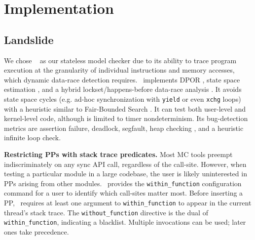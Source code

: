 \section{Implementation}
\label{sec:implementation}

\subsection{Landslide}
\label{sec:landslide}

We chose \landslide~\cite{landslide} as our stateless model checker due to its ability to trace program execution at the granularity of individual instructions and memory accesses, which dynamic data-race detection requires.
\landslide~implements DPOR \cite{dpor},
state space estimation \cite{estimation}, and a hybrid lockset/happens-before data-race analysis \cite{hybriddatarace}.
It avoids state space cycles (e.g. ad-hoc synchronization with {\tt yield} or even {\tt xchg} loops) with a heuristic similar to Fair-Bounded Search \cite{bpor}.
It can test both user-level and kernel-level code, although is limited to timer nondeterminism.
Its bug-detection metrics are assertion failure, deadlock, segfault, heap checking \cite{valgrind}, and a heuristic infinite loop check.

{\bf Restricting PPs with stack trace predicates.}
Most MC tools preempt indiscriminately on any sync API call, regardless of the call-site.
However, when testing a particular module in a large codebase,
the user is likely uninterested in PPs arising from other modules.
\landslide~provides the {\tt within\_function} configuration command for a user to identify which call-sites matter most.
Before inserting a PP, \landslide~requires at least one argument to {\tt within\_function} to appear in the current thread's stack trace.
The {\tt without\_function} directive is the dual of {\tt within\_function}, indicating a blacklist.
Multiple invocations can be used; later ones take precedence.

